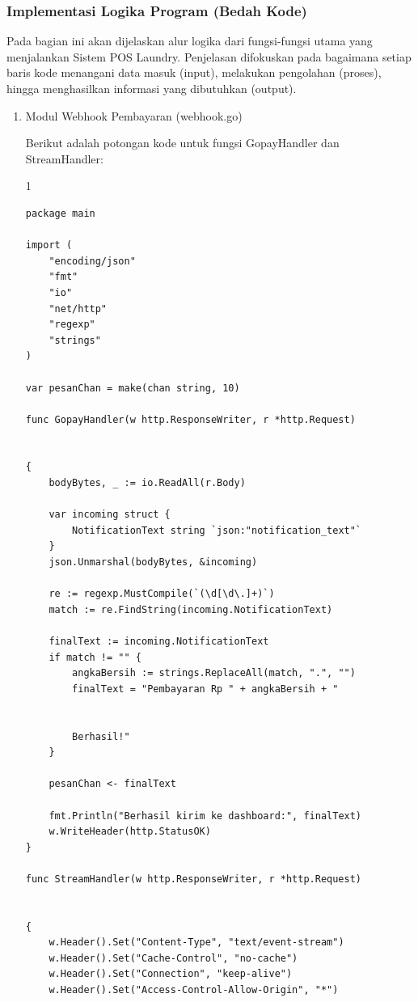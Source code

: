 \subsubsection{Implementasi Logika Program (Bedah Kode)}
\indent
Pada bagian ini akan dijelaskan alur logika dari fungsi-fungsi utama yang menjalankan Sistem POS Laundry. Penjelasan difokuskan pada bagaimana setiap baris kode menangani data masuk (input), melakukan pengolahan (proses), hingga menghasilkan informasi yang dibutuhkan (output).	

\begin{enumerate}
    \item Modul Webhook Pembayaran (webhook.go)


    \noindent
    Berikut adalah potongan kode untuk fungsi GopayHandler dan StreamHandler:

\begin{spacing}{1}
\begin{Verbatim}[frame=single, fontsize=\small]
package main

import (
    "encoding/json"
    "fmt"
    "io"
    "net/http"
    "regexp"
    "strings"
)

var pesanChan = make(chan string, 10)

func GopayHandler(w http.ResponseWriter, r *http.Request) 


{
    bodyBytes, _ := io.ReadAll(r.Body)

    var incoming struct {
        NotificationText string `json:"notification_text"`
    }
    json.Unmarshal(bodyBytes, &incoming)

    re := regexp.MustCompile(`(\d[\d\.]+)`)
    match := re.FindString(incoming.NotificationText)

    finalText := incoming.NotificationText
    if match != "" {
        angkaBersih := strings.ReplaceAll(match, ".", "")
        finalText = "Pembayaran Rp " + angkaBersih + " 
        
        
        Berhasil!"
    }

    pesanChan <- finalText

    fmt.Println("Berhasil kirim ke dashboard:", finalText)
    w.WriteHeader(http.StatusOK)
}

func StreamHandler(w http.ResponseWriter, r *http.Request) 


{
    w.Header().Set("Content-Type", "text/event-stream")
    w.Header().Set("Cache-Control", "no-cache")
    w.Header().Set("Connection", "keep-alive")
    w.Header().Set("Access-Control-Allow-Origin", "*")


\end{Verbatim}
\end{spacing}
\end{enumerate}
